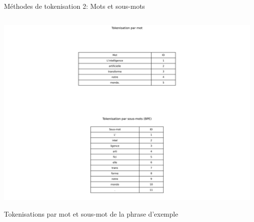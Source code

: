 \documentclass[aspectratio=169,11pt]{beamer}
\begin{document}
\begin{frame}{Méthodes de tokenisation 2: Mots et sous-mots}
\begin{columns}
\begin{column}{0.5\textwidth}
            \includegraphics[width=\textwidth]{images/generated/word_subword_tokenization.png}
            \vspace{0.2cm}
            \begin{center}
                \small{Tokenisations par mot et sous-mot de la phrase d'exemple}
            \end{center}
        \end{column}
    \end{columns}
\end{frame}
\end{document}
